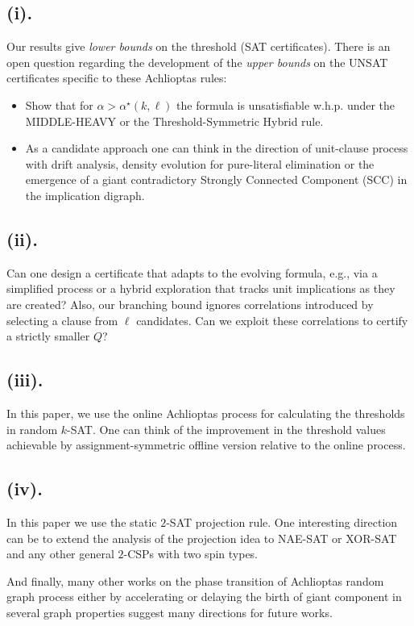 \documentclass[11pt,reqno]{amsart}
\numberwithin{equation}{section}
\begin{document}
   \subsection*{(i).}
   Our results give \emph{lower bounds} on the threshold (SAT certificates). 
   There is an open question regarding the development of the  \emph{upper bounds} on the UNSAT certificates specific to these Achlioptas rules:
   \begin{itemize}
   	\item Show that for $\alpha> \alpha^\star(k,\ell)$ the formula is unsatisfiable w.h.p. under the MIDDLE-HEAVY or the Threshold-Symmetric Hybrid rule.
   	\item As a candidate approach one can think in the direction of unit-clause process with drift analysis, density evolution for pure-literal elimination or the emergence of a giant contradictory Strongly Connected Component (SCC) in the implication digraph.
   \end{itemize}
   
   \subsection*{(ii).}
   Can one design a certificate that adapts to the evolving formula, e.g., via a simplified process or a hybrid exploration that tracks unit implications as they are created?
   Also, our branching bound ignores correlations introduced by selecting a clause from $\ell$ candidates. 
   Can we exploit these correlations to certify a strictly smaller $Q$?
   
   \subsection*{(iii).}
   In this paper, we use the online Achlioptas process for calculating the thresholds in random $k$-SAT.
   One can think of the improvement in the threshold values achievable by assignment-symmetric offline version relative to the online process.
   
   \subsection*{(iv).}
   In this paper we use the static $2$-SAT projection rule.
   One interesting direction can be to extend the analysis of the projection idea to NAE-SAT or XOR-SAT and any other general $2$-CSPs with two spin types.
   
  And finally, many other works on the phase transition of Achlioptas random graph process either by accelerating or delaying the birth of giant component in several graph properties suggest many directions for future works.
   
\end{document}
